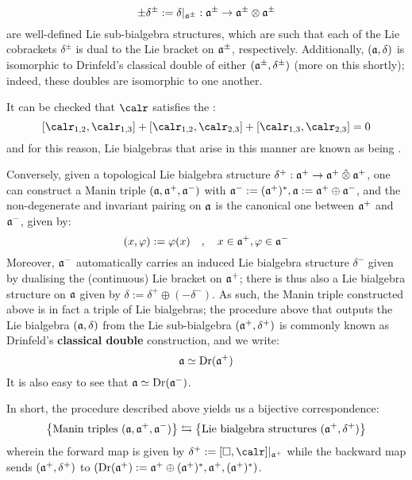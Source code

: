             $$\pm \delta^{\pm} := \delta|_{\a^{\pm}}: \a^{\pm} \to \a^{\pm} \tensor \a^{\pm}$$
        are well-defined Lie sub-bialgebra structures, which are such that each of the Lie cobrackets $\delta^{\pm}$ is dual to the Lie bracket on $\mathfrak{a}^{\pm}$, respectively. Additionally, $(\mathfrak{a}, \delta)$ is isomorphic to Drinfeld's classical double of either $(\mathfrak{a}^{\pm}, \delta^{\pm})$ (more on this shortly); indeed, these doubles are isomorphic to one another.
        \begin{remark}
            It can be checked that $\calr$ satisfies the :
                \begin{equation} \label{equation: CYBE}
                    [\calr_{1, 2}, \calr_{1, 3}] + [\calr_{1, 2}, \calr_{2, 3}] + [\calr_{1, 3}, \calr_{2, 3}] = 0
                \end{equation}
            and for this reason, Lie bialgebras that arise in this manner are known as being .
        \end{remark}
        
        Conversely, given a topological Lie bialgebra structure $\delta^+: \a^+ \to \a^+ \hattensor \a^+$, one can construct a Manin triple $(\mathfrak{a}, \mathfrak{a}^+, \mathfrak{a}^-)$ with $\mathfrak{a}^- := (\mathfrak{a}^+)^*, \mathfrak{a} := \mathfrak{a}^+ \oplus \mathfrak{a}^-$, and the non-degenerate and invariant pairing on $\mathfrak{a}$ is the canonical one between $\mathfrak{a}^+$ and $\mathfrak{a}^-$, given by:
            $$(x, \varphi) := \varphi(x) \quad, \quad x \in \mathfrak{a}^+, \varphi \in \mathfrak{a}^-$$
        Moreover, $\mathfrak{a}^-$ automatically carries an induced Lie bialgebra structure $\delta^-$ given by dualising the (continuous) Lie bracket on $\mathfrak{a}^+$; there is thus also a Lie bialgebra structure on $\mathfrak{a}$ given by $\delta := \delta^+ \oplus (-\delta^-)$. As such, the Manin triple constructed above is in fact a triple of Lie bialgebras; the procedure above that outputs the Lie bialgebra $(\mathfrak{a}, \delta)$ from the Lie sub-bialgebra $(\mathfrak{a}^+, \delta^+)$ is commonly known as Drinfeld's \textbf{classical double} construction, and we write:
            $$\mathfrak{a} \simeq \operatorname{Dr}(\mathfrak{a}^+)$$
        It is also easy to see that $\mathfrak{a} \simeq \operatorname{Dr}(\mathfrak{a}^-)$.

        In short, the procedure described above yields us a bijective correspondence:
            \begin{equation} \label{equation: manin_triple_lie_bialgebra_correspondence}
                \left\{ \text{Manin triples $(\mathfrak{a}, \mathfrak{a}^+, \mathfrak{a}^-)$} \right\} \leftrightarrows \left\{ \text{Lie bialgebra structures $(\mathfrak{a}^+, \delta^+)$} \right\}
            \end{equation}
        wherein the forward map is given by $\delta^+ := [\Box, \calr]|_{\a^+}$ while the backward map sends $(\mathfrak{a}^+, \delta^+)$ to $(\operatorname{Dr}(\mathfrak{a}^+) := \mathfrak{a}^+ \oplus (\mathfrak{a}^+)^*, \mathfrak{a}^+, (\mathfrak{a}^+)^*)$.

